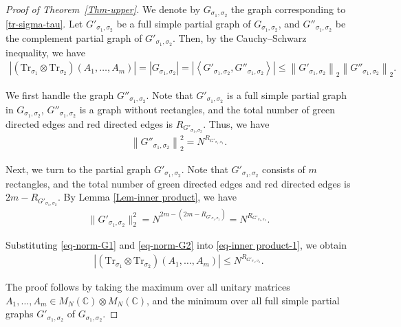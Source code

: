 \documentclass[12pt]{article}
\numberwithin{equation}{section}
\theoremstyle{plain}
\def\bC{\mathbb C}
\def\Tr{\mathrm {Tr}}
\begin{document}
\begin{proof}[Proof of Theorem~\ref{Thm-upper}]
We denote by $G_{\sigma_1,\sigma_2}$ the graph corresponding to \eqref{tr-sigma-tau}. Let $G'_{\sigma_1,\sigma_2}$ be a full simple partial graph of $G_{\sigma_1,\sigma_2}$, and $G''_{\sigma_1,\sigma_2}$ be the complement partial graph of $G'_{\sigma_1,\sigma_2}$. Then, by the Cauchy--Schwarz inequality, we have
\begin{align} \label{eq-inner product-1}
    \left| \left( \Tr_{\sigma_1} \otimes \Tr_{\sigma_2} \right) \left( A_1, \ldots, A_m \right) \right|
    = | G_{\sigma_1,\sigma_2} |
    = \left| \left\langle G'_{\sigma_1,\sigma_2}, G''_{\sigma_1,\sigma_2} \right\rangle \right|
    \le \left\|G'_{\sigma_1,\sigma_2} \right\|_2 \left\| G''_{\sigma_1,\sigma_2} \right\|_2.
\end{align}

We first handle the graph $G''_{\sigma_1,\sigma_2}$. Note that $G'_{\sigma_1,\sigma_2}$ is a full simple partial graph in $G_{\sigma_1,\sigma_2}$, $G''_{\sigma_1,\sigma_2}$ is a graph without rectangles, and the total number of green directed edges and red directed edges is $R_{G'_{\sigma_1,\sigma_2}}$. Thus, we have
\begin{align}\label{eq-norm-G2}
    \left\| G''_{\sigma_1,\sigma_2} \right\|_2^2 = N^{R_{G'_{\sigma_1,\sigma_2}}}.
\end{align}

Next, we turn to the partial graph $G'_{\sigma_1,\sigma_2}$. Note that $G'_{\sigma_1,\sigma_2}$ consists of $m$ rectangles, and the total number of green directed edges and red directed edges is $2m-R_{G'_{\sigma_1,\sigma_2}}$. By Lemma \ref{Lem-inner product}, we have
\begin{align}\label{eq-norm-G1}
    \|G'_{\sigma_1,\sigma_2}\|_2^2
    = N^{2m - \left( 2m-R_{G'_{\sigma_1,\sigma_2}} \right)}
    = N^{R_{G'_{\sigma_1,\sigma_2}}}.
\end{align}

Substituting \eqref{eq-norm-G1} and \eqref{eq-norm-G2} into \eqref{eq-inner product-1}, we obtain
\begin{align*}
    \left| \left( \Tr_{\sigma_1} \otimes \Tr_{\sigma_2} \right) \left( A_1, \ldots, A_m \right) \right|
    \le N^{R_{G'_{\sigma_1,\sigma_2}}}.
\end{align*}

The proof follows by taking the maximum over all unitary matrices $A_1,\ldots,A_m \in M_N (\bC) \otimes M_N(\bC)$, and the minimum over all full simple partial graphs $G'_{\sigma_1,\sigma_2}$ of $G_{\sigma_1,\sigma_2}$.
\end{proof}
\end{document}
